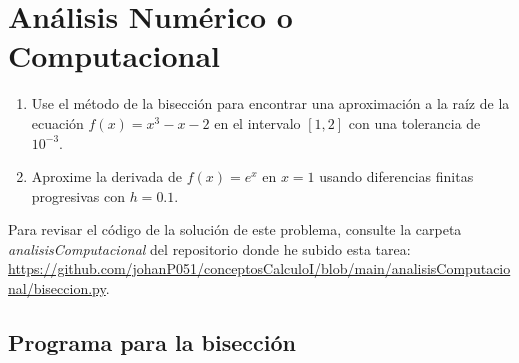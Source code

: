 \section{Análisis Numérico o Computacional}

\begin{enumerate}
    \item Use el método de la bisección para encontrar una aproximación a la raíz de la ecuación \(f(x)=x^3-x-2\) en el intervalo \([1,2]\) con una tolerancia de \(10^{-3}\).
    \item Aproxime la derivada de \(f(x)=e^x\) en \(x=1\) usando diferencias finitas progresivas con \(h=0.1\).
\end{enumerate}

Para revisar el código de la solución de este problema, consulte la carpeta \textit{analisisComputacional} del repositorio donde he subido esta tarea: \url{https://github.com/johanP051/conceptosCalculoI/blob/main/analisisComputacional/biseccion.py}.

\subsection*{Programa para la bisección}

